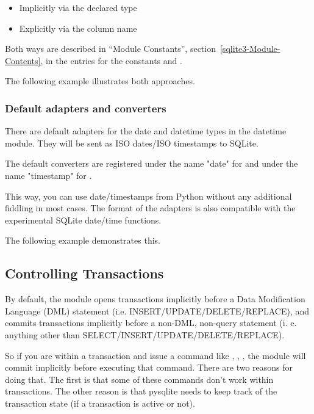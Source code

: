 \begin{itemize}
 \item Implicitly via the declared type
 \item Explicitly via the column name
\end{itemize}

Both ways are described in ``Module Constants'', section~\ref{sqlite3-Module-Contents}, in
the entries for the constants  and
.


The following example illustrates both approaches.

    

\subsubsection{Default adapters and converters}

There are default adapters for the date and datetime types in the datetime
module. They will be sent as ISO dates/ISO timestamps to SQLite.

The default converters are registered under the name "date" for 
and under the name "timestamp" for .

This way, you can use date/timestamps from Python without any additional
fiddling in most cases. The format of the adapters is also compatible with the
experimental SQLite date/time functions.

The following example demonstrates this.

    

\subsection{Controlling Transactions \label{sqlite3-Controlling-Transactions}}

By default, the  module opens transactions implicitly before a Data Modification Language (DML) 
statement (i.e. INSERT/UPDATE/DELETE/REPLACE), and commits transactions implicitly
before a non-DML, non-query statement (i. e. anything other than
SELECT/INSERT/UPDATE/DELETE/REPLACE).

So if you are within a transaction and issue a command like , , , the  module will commit implicitly
before executing that command. There are two reasons for doing that. The first
is that some of these commands don't work within transactions. The other reason
is that pysqlite needs to keep track of the transaction state (if a transaction
is active or not).


